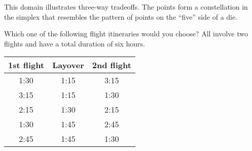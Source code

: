 This domain illustrates three-way tradeoffs.
The points form a constellation in the simplex that resembles the pattern of points on the ``five'' side of a die.

\begin{tcolorbox}
Which one of the following flight itineraries would you choose? All involve two
flights and have a total duration of six hours.

\begin{tabular}{ccc}
\hline
	1st flight & Layover & 2nd flight \\ \hline
	1:30 & 1:15 & 3:15 \\ 
	3:15 & 1:15 & 1:30 \\ 
	2:15 & 1:30 & 2:15 \\ 
	1:30 & 1:45 & 2:45 \\ 
	2:45 & 1:45 & 1:30 \\ \hline
\end{tabular}
\end{tcolorbox}
